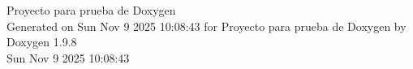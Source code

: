 \documentclass[twoside]{article}
\newcommand{\+}{\discretionary{\mbox{\scriptsize$\hookleftarrow$}}{}{}}
\newcommand{\clearemptydoublepage}{%
    \newpage{\pagestyle{empty}\cleardoublepage}%
  }
\begin{document}
  \raggedbottom
    \hypersetup{pageanchor=false,
                bookmarksnumbered=true,
                pdfencoding=unicode
               }
  \begin{titlepage}
  \vspace*{7cm}
  \begin{center}%
  {\Large Proyecto para prueba de Doxygen}\\
  \vspace*{1cm}
  {\large Generated on Sun Nov 9 2025 10\+:08\+:43 for Proyecto para prueba de Doxygen by Doxygen 1.9.8}\\
    \vspace*{0.5cm}
    {\small Sun Nov 9 2025 10:08:43}
  \end{center}
  \end{titlepage}
  \tableofcontents
  \hypersetup{pageanchor=true}
  \newpage
  \clearemptydoublepage
  \printindex
\end{document}
